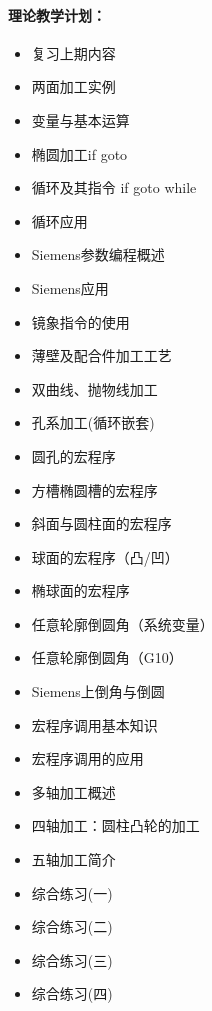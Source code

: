 \paragraph{理论教学计划：}
\begin{itemize}
	\item 复习上期内容

	\item 两面加工实例

	\item 变量与基本运算

	\item 椭圆加工if  goto

	\item 循环及其指令 if goto while

	\item 循环应用

	\item Siemens参数编程概述

	\item Siemens应用

	\item 镜象指令的使用

	\item 薄壁及配合件加工工艺

	\item 双曲线、抛物线加工

	\item 孔系加工(循环嵌套)

	\item 圆孔的宏程序

	\item 方槽椭圆槽的宏程序
	\item 斜面与圆柱面的宏程序

	\item 球面的宏程序（凸/凹）

	\item 椭球面的宏程序

	\item 任意轮廓倒圆角（系统变量）

	\item 任意轮廓倒圆角（G10）

	\item Siemens上倒角与倒圆

	\item 宏程序调用基本知识

	\item 宏程序调用的应用

	\item 多轴加工概述

	\item 四轴加工：圆柱凸轮的加工

	\item 五轴加工简介

	\item 综合练习(一)

	\item 综合练习(二)

	\item 综合练习(三)

	\item 综合练习(四)

\end{itemize}

